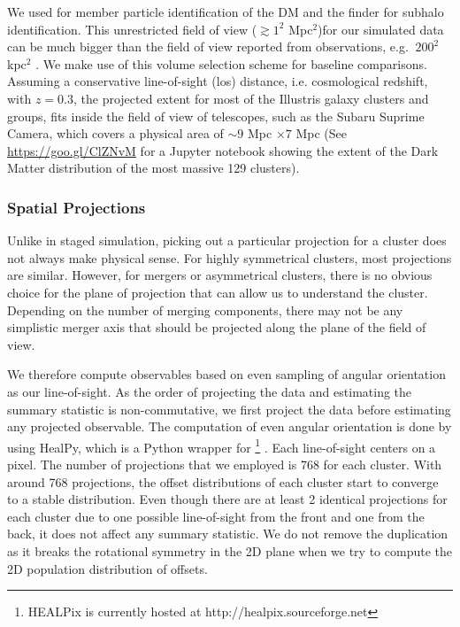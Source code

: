 We used {} for member particle identification of the DM and the 
{} finder for subhalo identification.
This unrestricted field of view ($\gtrsim 1^2$ Mpc$^2$)for our simulated data can be much bigger than
the field of view reported from
observations, e.g. $~200^2$ kpc$^2$ \citep{Zitrin2012a}. We make use of this volume selection scheme
for baseline comparisons. Assuming a conservative line-of-sight (los) distance, 
i.e. cosmological redshift, with  $z = 0.3$, 
the projected extent for most of the Illustris galaxy clusters and groups, 
fits inside the field of view of telescopes, such as the Subaru Suprime Camera,
which covers a physical area of $\sim 9$ Mpc $\times 7$ Mpc 
(See \href{https://goo.gl/ClZNvM}{https://goo.gl/ClZNvM} for a Jupyter notebook 
showing the extent of the Dark Matter distribution of the most massive 129
clusters).

\subsubsection{Spatial Projections}
\label{subsubsec:projections}
Unlike in staged simulation, picking out a particular projection for a cluster 
does not always make physical sense.
For highly symmetrical clusters, most projections are similar. 
However, for mergers or asymmetrical clusters, 
there is no obvious choice for the plane of projection that can allow us to
understand the cluster. Depending on the number of merging components, there
may not be any simplistic merger axis that should be 
projected along the plane of the field of view. 

We therefore compute observables based on even sampling of angular orientation 
as our line-of-sight.
As the order of projecting the data and estimating the summary statistic is
non-commutative, we first project the data before estimating any projected 
observable. 
The computation of even angular orientation 
is done by using {\sc HealPy}, which is a {\sc Python} wrapper for
{} \footnote{HEALPix is
currently hosted at http://healpix.sourceforge.net}
\citep{Gorski2005}. Each line-of-sight centers on a {} 
pixel.
The number of projections that we employed is 768 for each cluster. With around 
768 projections, the offset distributions of each cluster start to converge to a
stable distribution. 
Even though there are at least 2 identical projections for each cluster due to
one possible line-of-sight from the front and one from the back, it does not
affect any summary statistic. We do not remove the duplication as it breaks
the rotational symmetry in the 2D plane when we try to compute the 2D population
distribution of offsets.  


